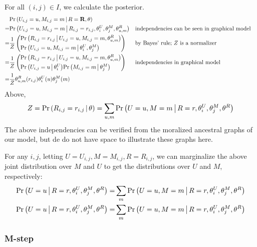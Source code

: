 \documentclass{article}
\begin{document}
For all $(i,j) \in I$, we calculate the posterior.
\begin{align}
& {{\Pr \left(   U_{i,j} = u, M_{i,j} = m  \,\middle|\,  R = {\bf R}, \theta   \right)}} \\
=& {{\Pr \left(   U_{i,j} = u, M_{i,j} = m  \,\middle|\,  R_{i,j} = r_{i,j}, \theta^U_i,
  \theta^M_j, \theta^R_{u,m}   \right)}}
&&
\text{independencies can be seen in graphical model} \\
=& \frac{1}{Z} \left(
\begin{aligned}
& {{\Pr \left(  R_{i,j} = r_{i,j}  \,\middle|\, U_{i,j} = u, M_{i,j} = m, \theta^R_{u,m}  \right)}} \\
& {{\Pr \left(  U_{i,j} = u, M_{i,j} = m \,\middle|\, \theta^U_i, \theta^M_j  \right)}}
\end{aligned} \right)
&& \text{by Bayes' rule; $Z$ is a normalizer} \\
=& \frac{1}{Z} \left(
\begin{aligned}
& {{\Pr \left(  R_{i,j} = r_{i,j}  \,\middle|\, U_{i,j} = u, M_{i,j} = m, \theta^R_{u,m}  \right)}} \\
& {{\Pr \left(  U_{i,j} = u  \,\middle|\, \theta^U_i  \right)}}
  {{\Pr \left(  M_{i,j} = m  \,\middle|\, \theta^M_j  \right)}}
\end{aligned} \right)
&& \text{independencies in graphical model} \\
=& \frac{1}{Z} \theta^R_{u,m}(r_{i,j}) \theta^U_i(u) \theta^M_j(m)
\label{eq:pumrij}
\end{align}
Above,
\begin{align}
  Z = {{\Pr \left(  R_{i,j} = r_{i,j} \,\middle|\, \theta  \right)}} = \sum_{u,m} {{\Pr \left(  U = u, M = m \,\middle|\, R = r, \theta^U_i, \theta^M_j,
    \theta^R  \right)}}
\end{align}
The above independencies can be verified from the moralized ancestral
graphs of our model, but de do not have space to illustrate these
graphs here.

For any $i,j$,
letting $U = U_{i,j}, M = M_{i,j}, R = R_{i,j}$,
we can marginalize the above joint distribution over $M$ and $U$
to get the distributions over $U$ and $M$, respectively:
\begin{align}
  {{\Pr \left(  U = u \,\middle|\, R = r, \theta^U_i, \theta^M_j, \theta^R  \right)}}
  =& \sum_m {{\Pr \left(  U = u, M = m \,\middle|\, R = r, \theta^U_i, \theta^M_j, \theta^R  \right)}}
\\
  {{\Pr \left(  U = u \,\middle|\, R = r, \theta^U_i, \theta^M_j, \theta^R  \right)}}
  =& \sum_m {{\Pr \left(  U = u, M = m \,\middle|\, R = r, \theta^U_i, \theta^M_j, \theta^R  \right)}}
\end{align}

\subsubsection{M-step}
\end{document}
